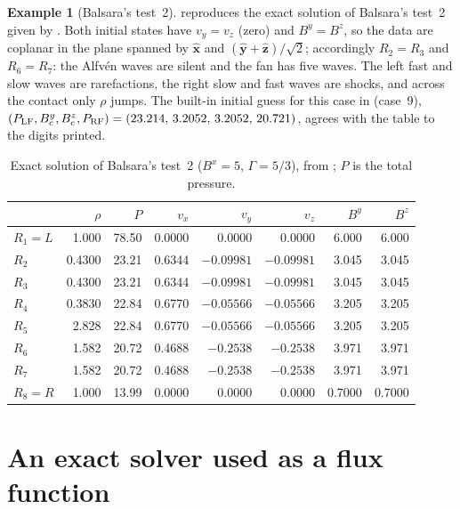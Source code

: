 \documentclass[11pt,a4paper,oneside,openany]{book}
\newcommand{\textcite}{\citet}
\theoremstyle{definition}
\newtheorem{example}{Example}[chapter]
\theoremstyle{plain}
\theoremstyle{remark}
\newcommand{\Ptot}{P}
\newcommand{\file}[1]{\texttt{\detokenize{#1}}}
\begin{document}
\begin{example}[Balsara's test~2]\label{ex:balsara2}
 reproduces the exact solution of Balsara's test~2 given by
\textcite[Table~8]{GiacomazzoRezzolla2006}. Both initial states have $v_y=v_z$ (zero) and
$B^y=B^z$, so the data are coplanar in the plane spanned by $\hat{\bm x}$ and
$(\hat{\bm y}+\hat{\bm z})/\sqrt2$; accordingly $R_2=R_3$ and $R_6=R_7$: the Alfvén waves are
silent and the fan has five waves. The left fast and slow waves are rarefactions, the right
slow and fast waves are shocks, and across the contact only $\rho$ jumps. The built-in initial
guess for this case in \file{rmhd/initial_data.py} (case~9),
$(\Ptot_{\rm LF},B^y_c,B^z_c,\Ptot_{\rm RF})=(23.214,\,3.2052,\,3.2052,\,20.721)$, agrees with
the table to the digits printed.
\end{example}

\begin{table}[t]
\centering\small
\begin{tabular}{@{}lrrrrrrr@{}}
\toprule
 & $\rho$ & $\Ptot$ & $v_x$ & $v_y$ & $v_z$ & $B^y$ & $B^z$\\
\midrule
$R_1=L$ & 1.000 & 78.50 & 0.0000 & 0.0000 & 0.0000 & 6.000 & 6.000\\
$R_2$ & 0.4300 & 23.21 & 0.6344 & $-0.09981$ & $-0.09981$ & 3.045 & 3.045\\
$R_3$ & 0.4300 & 23.21 & 0.6344 & $-0.09981$ & $-0.09981$ & 3.045 & 3.045\\
$R_4$ & 0.3830 & 22.84 & 0.6770 & $-0.05566$ & $-0.05566$ & 3.205 & 3.205\\
$R_5$ & 2.828 & 22.84 & 0.6770 & $-0.05566$ & $-0.05566$ & 3.205 & 3.205\\
$R_6$ & 1.582 & 20.72 & 0.4688 & $-0.2538$ & $-0.2538$ & 3.971 & 3.971\\
$R_7$ & 1.582 & 20.72 & 0.4688 & $-0.2538$ & $-0.2538$ & 3.971 & 3.971\\
$R_8=R$ & 1.000 & 13.99 & 0.0000 & 0.0000 & 0.0000 & 0.7000 & 0.7000\\
\bottomrule
\end{tabular}
\caption{Exact solution of Balsara's test~2 ($B^x=5$, $\Gamma=5/3$), from
\textcite[Table~8]{GiacomazzoRezzolla2006}; $\Ptot$ is the total pressure.}
\label{tab:balsara2}
\end{table}

\section{An exact solver used as a flux function}\label{sec:student-impl}
\end{document}
